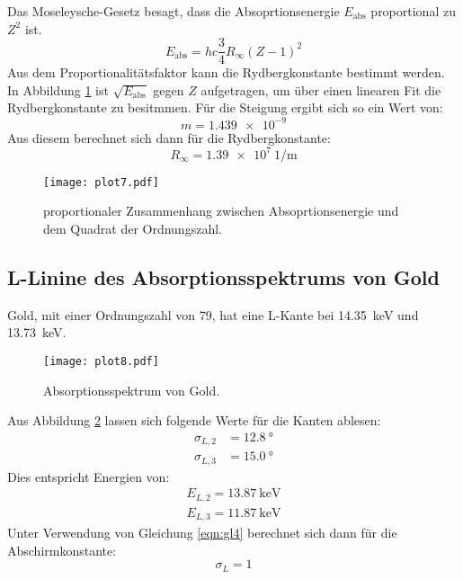 Das Moseleysche-Gesetz besagt, dass die Absoprtionsenergie $E_\text{abs}$ proportional zu $Z^2$ ist.
\begin{equation}
  E_\text{abs} = h c \frac{3}{4} R_\infty (Z-1)^2
\end{equation}
Aus dem Proportionalitätsfaktor kann die Rydbergkonstante bestimmt werden.
In Abbildung \ref{fig:plot7} ist $\sqrt{E_\text{abs}}$ gegen $Z$ aufgetragen, um über einen linearen Fit die Rydbergkonstante zu besitmmen.
Für die Steigung ergibt sich so ein Wert von:
\begin{equation*}
  m = \num{1.439e-9}
\end{equation*}
Aus diesem berechnet sich dann für die Rydbergkonstante:
\begin{equation*}
  R_\infty = \SI{1.39e7}{1\per\meter}
\end{equation*}
\begin{figure}
  \centering
  \texttt{[image: plot7.pdf]}
  \caption{proportionaler Zusammenhang zwischen Absoprtionsenergie und dem Quadrat der Ordnungszahl.}
  \label{fig:plot7}
\end{figure}
\FloatBarrier

\subsection{L-Linine des Absorptionsspektrums von Gold}

Gold, mit einer Ordnungszahl von 79, hat eine L-Kante bei \SI{14.35}{\kilo\eV} und \SI{13.73}{\kilo\eV}.
\begin{figure}
  \centering
  \texttt{[image: plot8.pdf]}
  \caption{Absorptionsspektrum von Gold.}
  \label{fig:plot8}
\end{figure}
Aus Abbildung \ref{fig:plot8} lassen sich folgende Werte für die Kanten ablesen:
\begin{align*}
  \sigma_{L,2} &= \SI{12.8}{\degree}\\
  \sigma_{L,3} &= \SI{15.0}{\degree}
\end{align*}
Dies entspricht Energien von:
\begin{align*}
  E_{L,2} = \SI{13.87}{\kilo\eV} \\
  E_{L,3} = \SI{11,87}{\kilo\eV}
\end{align*}
Unter Verwendung von Gleichung \eqref{eqn:gl4} berechnet sich dann für die Abschirmkonstante:
\begin{equation*}
  \sigma_L = 1
\end{equation*}
